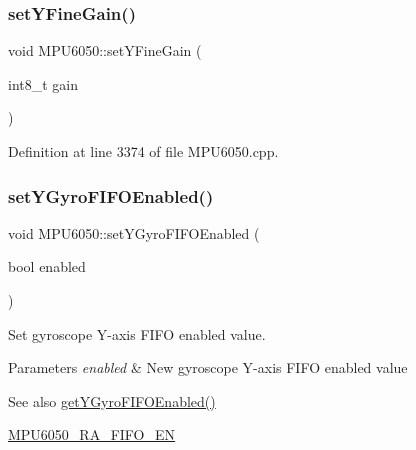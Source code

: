 \subsubsection{\texorpdfstring{setYFineGain()}{setYFineGain()}}
{\footnotesize\ttfamily void M\+P\+U6050\+::set\+Y\+Fine\+Gain (\begin{DoxyParamCaption}\item[{int8\+\_\+t}]{gain }\end{DoxyParamCaption})}



Definition at line 3374 of file M\+P\+U6050.\+cpp.


\begin{DoxyCode}{0}

\end{DoxyCode}
\mbox{\label{classMPU6050_a16eb12bbf07bc17a9d852941d834175e}} 
\subsubsection{\texorpdfstring{setYGyroFIFOEnabled()}{setYGyroFIFOEnabled()}}
{\footnotesize\ttfamily void M\+P\+U6050\+::set\+Y\+Gyro\+F\+I\+F\+O\+Enabled (\begin{DoxyParamCaption}\item[{bool}]{enabled }\end{DoxyParamCaption})}

Set gyroscope Y-\/axis F\+I\+FO enabled value. 
\begin{DoxyParams}{Parameters}
{\em enabled} & New gyroscope Y-\/axis F\+I\+FO enabled value \\
\hline
\end{DoxyParams}
\begin{DoxySeeAlso}{See also}
\mbox{\hyperlink{classMPU6050_a86c85d5b5c93df82394435b868e17463}{get\+Y\+Gyro\+F\+I\+F\+O\+Enabled()}} 

\mbox{\hyperlink{MPU6050_8h_a1166fe50f4792f3266e15dc3273e375d}{M\+P\+U6050\+\_\+\+R\+A\+\_\+\+F\+I\+F\+O\+\_\+\+EN}} 
\end{DoxySeeAlso}


